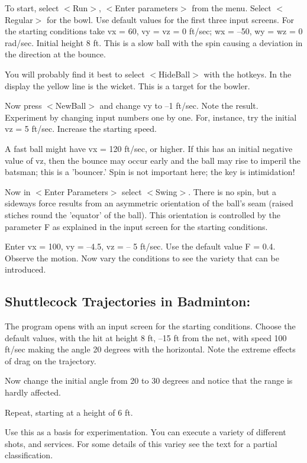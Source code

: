    To start, select $<$Run$>$, $<$Enter parameters$>$ from the menu. Select
$<$Regular$>$ for the bowl. Use default values for the first three input
screens. For the starting conditions take vx = 60, vy = vz = 0 ft/sec;
wx = --50, wy = wz = 0 rad/sec. Initial height 8 ft. This is a
slow ball with the spin causing a deviation in the direction at the bounce.

   You will probably find it best to select $<$HideBall$>$ with the hotkeys.
In the display the yellow line is the wicket. This is a target for the
bowler.

   Now press $<$NewBall$>$ and change vy to --1 ft/sec. Note the result.
Experiment by changing input numbers one by one. For, instance, try
the initial vz = 5 ft/sec. Increase the starting speed.

   A fast ball might have vx = 120 ft/sec, or higher. If this has
an initial negative value of vz, then the bounce may occur early and
the ball may rise to imperil the batsman; this is a 'bouncer.' Spin
is not important here; the key is intimidation!

   Now in $<$Enter Parameters$>$ select $<$Swing$>$. There is no spin, but
a sideways force results from an asymmetric orientation of the ball's
seam (raised stiches round the 'equator' of the ball). This orientation
is controlled by the parameter F as explained in the input screen
for the starting conditions.

   Enter vx = 100, vy = --4.5, vz = -- 5 ft/sec. Use the default value
F = 0.4. Observe the motion. Now vary the conditions to see the
variety that can be introduced.


\subsection{Shuttlecock Trajectories in Badminton:}

   The program opens with an input screen for the starting conditions.
Choose the default values, with the hit at height 8 ft, --15 ft from
the net, with speed 100 ft/sec making the angle 20 degrees with the
horizontal. Note the extreme effects of drag on the trajectory.

   Now change the initial angle from 20 to 30 degrees and notice that
the range is hardly affected.

   Repeat, starting at a height of 6 ft.

   Use this as a basis for experimentation. You can execute a variety
of different shots, and services. For some details of this variey
see the text for a partial classification.



